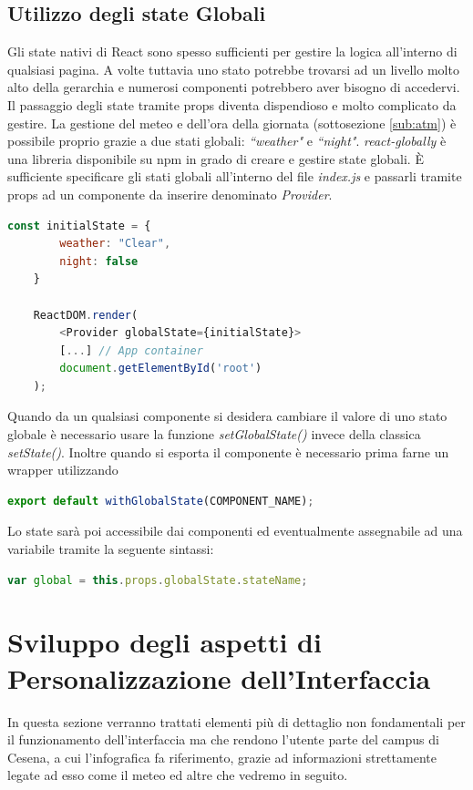 \subsection{Utilizzo degli state Globali}
\noindent Gli state nativi di React sono spesso sufficienti per gestire la logica all'interno di qualsiasi pagina. A volte tuttavia uno stato potrebbe trovarsi ad un livello molto alto della gerarchia e numerosi componenti potrebbero aver bisogno di accedervi. Il passaggio degli state tramite props diventa dispendioso e molto complicato da gestire.\newline
La gestione del meteo e dell'ora della giornata (sottosezione \ref{sub:atm}) è possibile proprio grazie a due stati globali: \textit{``weather"} e \textit{``night"}.\newline
\textit{react-globally} \cite{reactGlobal} è una libreria disponibile su npm in grado di creare e gestire state globali. È sufficiente specificare gli stati globali all'interno del file \textit{index.js} e passarli tramite props ad un componente da inserire denominato \textit{Provider}.
\begin{lstlisting}[language=Javascript]
    const initialState = {
        weather: "Clear",
        night: false
    }
    
    ReactDOM.render(
        <Provider globalState={initialState}>
        [...] // App container
        document.getElementById('root')
    );
\end{lstlisting}
Quando da un qualsiasi componente si desidera cambiare il valore di uno stato globale è necessario usare la funzione \textit{setGlobalState()} invece della classica \textit{setState()}.
Inoltre quando si esporta il componente è necessario prima farne un wrapper utilizzando 
\begin{lstlisting}[language=Javascript, numbers=none]
export default withGlobalState(COMPONENT_NAME);
\end{lstlisting}
Lo state sarà poi accessibile dai componenti ed eventualmente assegnabile ad una variabile tramite la seguente sintassi:
\begin{lstlisting}[language=Javascript, numbers=none]
var global = this.props.globalState.stateName;
\end{lstlisting}

\label{sub:globalState}
\section{Sviluppo degli aspetti di Personalizzazione dell'Interfaccia}
\noindent In questa sezione verranno trattati elementi più di dettaglio non fondamentali per il funzionamento dell'interfaccia ma che rendono l'utente parte del campus di Cesena, a cui l'infografica fa riferimento, grazie ad informazioni strettamente legate ad esso come il meteo ed altre che vedremo in seguito.
